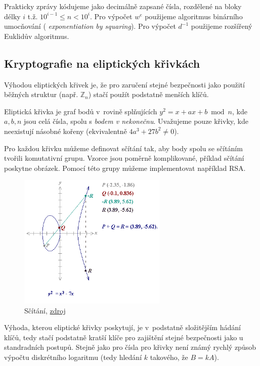 Prakticky zprávy kódujeme jako decimálně zapsané čísla,
rozdělené na bloky délky $i$ t.ž. $10^{i-1} \leq n < 10^i$.
Pro výpočet $w^e$ použijeme algoritmus binárního umocňování ({\em
exponentiation by squaring}).
Pro výpočet $d^{-1}$ použijeme rozšířený Euklidův
algoritmus.


\subsection{Kryptografie na eliptických křivkách}

Výhodou eliptických křivek je,
že pro zaručení stejné bezpečnosti jako použití běžných struktur (např.
$\mathbb{Z}_n$) stačí použít podstatně menších klíčů.

Eliptická křivka je graf bodů v~rovině splňujících
$y^2 = x + ax + b \bmod n$, kde $a,b,n$ jsou celá čísla,
spolu s {\em bodem v nekonečnu}. Uvažujeme pouze křivky, kde neexistují
násobné kořeny (ekvivalentně $4a^3 + 27b^2 \neq 0$).

Pro každou křivku můžeme definovat sčítání tak, aby body spolu se
sčítáním tvořili komutativní grupu. Vzorce jsou poměrně komplikované,
příklad sčítání poskytne obrázek. Pomocí této grupy můžeme implementovat
například RSA.

\begin{figure}[H]
    \centering
    \includegraphics[width=200pt]{ec_add.png}
    \caption{Sčítání, \href{https://www.certicom.com/content/certicom/en/21-elliptic-curve-addition-a-geometric-approach.html}{zdroj}}
\end{figure}

Výhoda, kterou eliptické křivky poskytují, je v~podstatně složitějším
hádání klíčů, tedy stačí podstatně kratší klíče pro zajištění stejné
bezpečnosti jako u standradních postupů. Stejně jako pro čísla
pro křivky není známý rychlý
způsob výpočtu diskrétního logaritmu (tedy hledání $k$ takového, že $B =
kA$).

